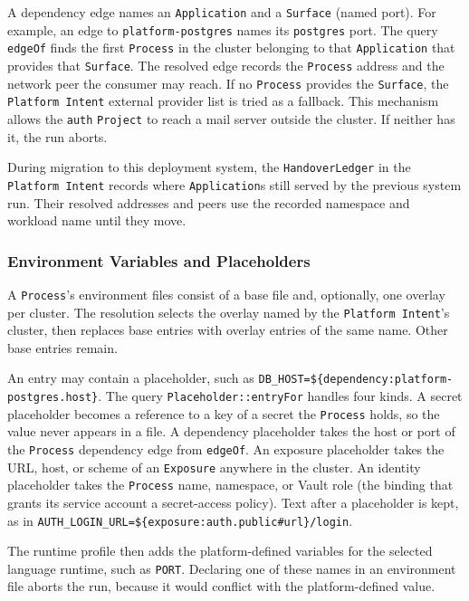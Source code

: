 A dependency edge names an \texttt{Application} and a \texttt{Surface}
(named port). For example, an edge to \texttt{platform-postgres} names its
\texttt{postgres} port. The query
\texttt{edgeOf} finds the first \texttt{Process} in the cluster belonging to
that \texttt{Application} that provides that \texttt{Surface}. The resolved edge
records the \texttt{Process} address and the network peer the consumer may
reach. If no \texttt{Process} provides the \texttt{Surface}, the
\texttt{Platform Intent} external provider list is tried as a fallback. This mechanism allows the \texttt{auth} \texttt{Project} to reach a mail server outside the cluster. If neither has it,
the run aborts.

During migration to this deployment system, the \texttt{HandoverLedger} in the
\texttt{Platform Intent} records where \texttt{Application}s still served by the
previous system run. Their resolved addresses and peers use the recorded
namespace and workload name until they move.

\subsubsection{Environment Variables and Placeholders}
\label{sec:placeholders}

A \texttt{Process}'s environment files consist of a base file and, optionally,
one overlay per cluster. The resolution selects the overlay named by the
\texttt{Platform Intent}'s cluster, then replaces base entries with overlay
entries of the same name. Other base entries remain.

An entry may contain a placeholder, such as
\texttt{DB\_HOST=\$\{dependency:platform-postgres.host\}}. The query
\texttt{Placeholder::entryFor} handles four kinds. A secret placeholder becomes a
reference to a key of a secret the \texttt{Process} holds, so the value never
appears in a file. A dependency placeholder takes the host or port of the
\texttt{Process} dependency edge from \texttt{edgeOf}. An exposure placeholder takes
the URL, host, or scheme of an \texttt{Exposure} anywhere in the cluster. An identity
placeholder takes the \texttt{Process} name, namespace, or Vault role (the
binding that grants its service account a secret-access policy). Text after a placeholder is kept, as in
\texttt{AUTH\_LOGIN\_URL=\$\{exposure:auth.public\#url\}/login}.

The runtime profile then adds the platform-defined variables for the
selected language runtime, such as \texttt{PORT}. Declaring one of these
names in an environment file aborts the run, because it would conflict with
the platform-defined value.

